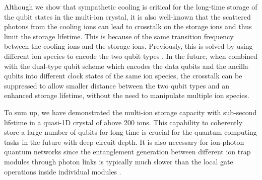 Although we show that sympathetic cooling is critical for the long-time storage of the qubit states in the multi-ion crystal, it is also well-known that the scattered photons from the cooling ions can lead to crosstalk on the storage ions and thus limit the storage lifetime. This is because of the same transition frequency between the cooling ions and the storage ions. Previously, this is solved by using different ion species to encode the two qubit types \cite{wang2021single,chen2017sympathetic,blinov2002sympathetic,barrett2003sympathetic,home2009memory}. In the future, when combined with the dual-type \cite{RN247} qubit scheme which encodes the data qubits and the ancilla qubits into different clock states of the same ion species, the crosstalk can be suppressed to allow smaller distance between the two qubit types and an enhanced storage lifetime, without the need to manipulate multiple ion species.

To sum up, we have demonstrated the multi-ion storage capacity with sub-second lifetime in a quasi-1D crystal of above 200 ions. This capability to coherently store a large number of qubits for long time is crucial for the quantum computing tasks in the future with deep circuit depth. It is also necessary for ion-photon quantum networks since the entanglement generation between different ion trap modules through photon links is typically much slower than the local gate operations inside individual modules \cite{hucul2015modular}.
